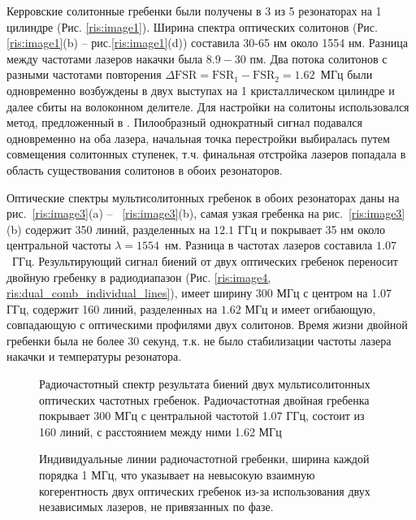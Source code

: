 Керровские солитонные гребенки были получены в 3 из 5 резонаторах на 1 цилиндре (Рис. \ref{ris:image1}). Ширина спектра оптических солитонов (Рис.\ref{ris:image1}(b) -- рис.\ref{ris:image1}(d)) составила 30-65 нм около 1554 нм. Разница между частотами лазеров накачки была $8.9-30$ пм. Два потока солитонов с разными частотами повторения $\Delta\mbox{FSR} = \mbox{FSR}_1 - \mbox{FSR}_2 = 1.62$~МГц были одновременно возбуждены в двух выступах на 1 кристаллическом цилиндре и далее сбиты на волоконном делителе. Для настройки на солитоны использовался метод, предложенный в \cite{Herr2014}. Пилообразный однократный сигнал подавался одновременно на оба лазера, начальная точка перестройки выбиралась путем совмещения солитонных ступенек, т.ч. финальная отстройка лазеров попадала в область существования солитонов в обоих резонаторов.

Оптические спектры мультисолитонных гребенок в обоих резонаторах даны на рис.~\ref{ris:image3}(a) -- ~\ref{ris:image3}(b), самая узкая гребенка на рис.~\ref{ris:image3}(b) содержит 350 линий, разделенных на $12.1$ ГГц и покрывает 35 нм около центральной частоты $\lambda = 1554$~нм. Разница в частотах лазеров составила $1.07$~ГГц. Результирующий сигнал биений от двух оптических гребенок переносит двойную гребенку в радиодиапазон (Рис. \ref{ris:image4, ris:dual_comb_individual_lines}), имеет ширину 300 МГц с центром на 1.07 ГГц, содержит 160 линий, разделенных на $1.62$ МГц и имеет огибающую, совпадающую с оптическими профилями двух солитонов. Время жизни двойной гребенки была не более 30 секунд, т.к. не было стабилизации частоты лазера накачки и температуры резонатора.

\begin{figure}[ht]
\begin{minipage}[ht]{1\linewidth}
\end{minipage}
\caption{Радиочастотный спектр результата биений двух мультисолитонных оптических частотных гребенок. Радиочастотная двойная гребенка покрывает 300 МГц с центральной частотой 1.07 ГГц, состоит из 160 линий, с расстоянием между ними 1.62 МГц}
\label{ris:image4}
\end{figure}

\begin{figure}[ht]
\begin{minipage}[ht]{1\linewidth}
\end{minipage}
\caption{Индивидуальные линии радиочастотной гребенки, ширина каждой порядка 1 МГц, что указывает на невысокую взаимную когерентность двух оптических гребенок из-за использования двух независимых лазеров, не привязанных по фазе.}
\label{ris:dual_comb_individual_lines}
\end{figure}



